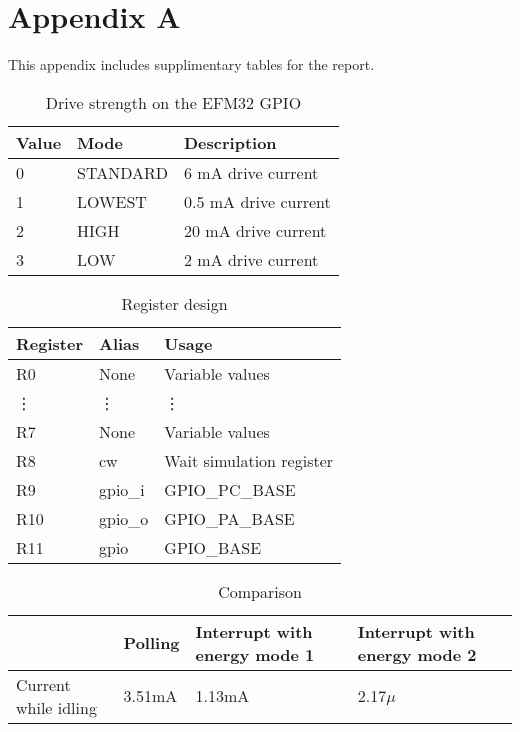 \section{Appendix A}
\label{appenix:a}

This appendix includes supplimentary tables for the report.

\begin{table}[ht!]
    \begin{center}
    \begin{tabular}{| l | l | l |}
        \hline
        Value   & Mode      & Description \\
        \hline
        0       & STANDARD  & 6 mA drive current \\
        \hline
        1       & LOWEST    & 0.5 mA drive current \\
        \hline
        2       & HIGH      & 20 mA drive current \\
        \hline
        3       & LOW       & 2 mA drive current \\
        \hline
    \end{tabular}
    \caption{Drive strength on the EFM32 GPIO}
    \label{tab:drive_strength}
    \end{center}
\end{table}

\begin{table}[ht!]
    \begin{center}
    \begin{tabular}{ | l | l | l | }
        \hline
        Register    & Alias     & Usage \\
        \hline
        R0          & None      & Variable values\\
        \vdots      & \vdots    & \vdots \\
        R7          & None      & Variable values \\
        \hline
        R8          & cw        & Wait simulation register \\
        \hline
        R9          & gpio\_i   & GPIO\_PC\_BASE \\
        \hline
        R10         & gpio\_o   & GPIO\_PA\_BASE \\
        \hline
        R11         & gpio      & GPIO\_BASE \\
        \hline
    \end{tabular}
    \caption{Register design}
    \label{tab:register_design}
    \end{center}
\end{table}

\begin{table}
    \begin{tabular}{|l|l|l|l|}
    \hline
    ~                    & Polling & Interrupt with  energy mode 1 & Interrupt with  energy mode 2 \\ \hline
    Current while idling & 3.51mA  & 1.13mA                        & 2.17$\mu$                     \\ \hline
    \end{tabular}
    \caption{Comparison}
    \label{tab:comparison}
\end{table}

